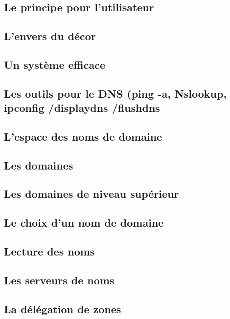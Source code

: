 \documentclass[12pt]{article}
\begin{document}
\subsection{Le principe pour l’utilisateur}


\subsection{L’envers du décor}


\subsection{Un système efficace}


\subsection{Les outils pour le DNS (ping -a, Nslookup, ipconfig /displaydns /flushdns}


\subsection{L’espace des noms de domaine}


\subsection{Les domaines}


\subsection{Les domaines de niveau supérieur}


\subsection{Le choix d’un nom de domaine}


\subsection{Lecture des noms}


\subsection{Les serveurs de noms}


\subsection{La délégation de zones}
\end{document}
